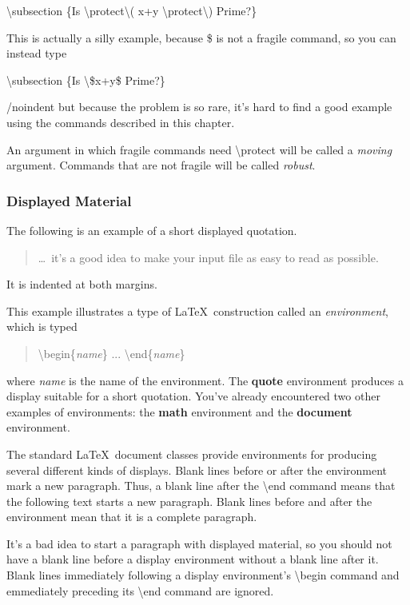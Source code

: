 \documentclass[twocolumn]{article}        %
\begin{document}
\textbackslash subsection \{Is \textbackslash protect\textbackslash (  x+y   \textbackslash protect\textbackslash ) Prime?\}

This is actually a silly example, because \$ is not a fragile command, so you can instead type

\textbackslash subsection \{Is \textbackslash \$x+y\$ Prime?\}

/noindent
but because the problem is so rare, it's hard to find a good example using the commands described in this chapter.

An argument in which fragile commands need \textbackslash protect will be called a \emph{moving} argument.
Commands that are not fragile will be called \emph{robust}.

\subsubsection{Displayed Material}

The following is an example of a short displayed quotation.

\begin{quote}
\ldots\ it's a good idea to make your input file as easy to read as possible.
\end{quote}

It is indented at both margins.


This example illustrates a type of \LaTeX\ construction called an \emph{environment}, which is typed

\begin{quote}
\textbackslash begin\{\emph{name}\} ... \textbackslash end\{\emph{name}\}
\end{quote}

where \emph{name} is the name of the environment.
The \textbf{quote} environment produces a display suitable for a short quotation.
You've already encountered two other examples of environments: the \textbf{math} environment and the 
\textbf{document} environment.

The standard \LaTeX\ document classes provide environments for producing several different kinds of displays.
Blank lines before or after the environment mark a new paragraph. Thus, a blank line after the \textbackslash end 
command means that the following text starts a new paragraph. Blank lines before and after the environment 
mean that it is a complete paragraph.

It's a bad idea to start a paragraph with displayed material, so you should not have a blank line before
a display environment without a blank line after it. Blank lines immediately following a display environment's 
\textbackslash begin command and emmediately preceding its \textbackslash end command are ignored.
\end{document}
